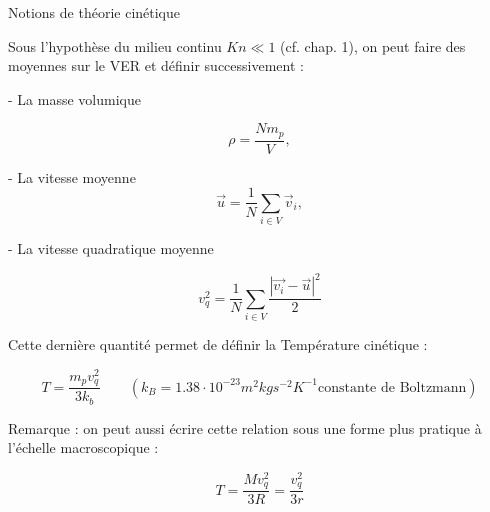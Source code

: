 \begin{frame}{Notions de théorie cinétique}

\small





Sous l'hypothèse du milieu continu $Kn \ll 1$ (cf. chap. 1), 
on peut faire des moyennes sur le VER et définir successivement :

\smallskip 
\pause
- La masse volumique

$$
\rho = \frac{ N m_p}{V}   ,
$$

\pause 
- La vitesse moyenne 
$$
\vec{u} = \frac{1}{N} \sum_{i \in V} \vec{v}_i  ,
$$



\pause
- La vitesse quadratique moyenne 


$$
v_q^2 =  \frac{1}{N} \sum_{i \in V} \frac{| \vec{v_i} - \vec{u}|^2}{2}
$$

\pause 
Cette dernière quantité permet de définir la Température cinétique :

$$
T = \frac{ m_p v_q^2}{3 k_b}  \qquad ( k_B = 1.38 \cdot  10^{-23} m^2 kg s^{-2} K^{-1} \mbox{constante de Boltzmann} )
$$  
 

Remarque : 
on peut aussi écrire cette relation sous une forme plus pratique à l'échelle macroscopique :

$$
T = \frac{ M v_q^2}{3 R}  =  \frac{v_q^2}{3 r}
$$






\end{frame}




